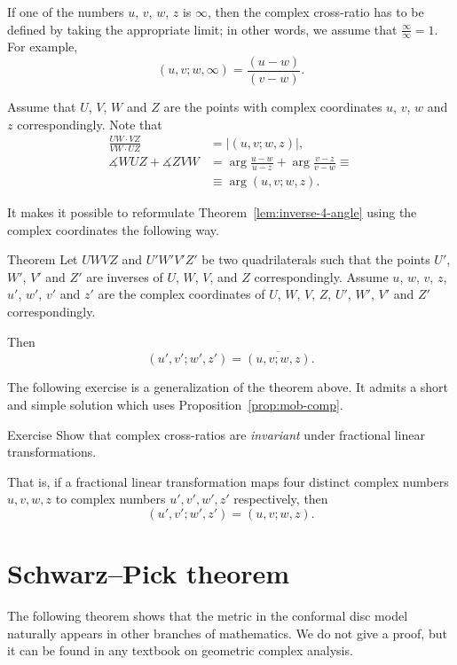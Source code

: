If one of the numbers $u$, $v$, $w$, $z$ is $\infty$, 
then the complex cross-ratio has to be defined by taking the appropriate limit; in other words, we assume that $\frac\infty\infty=1$.
For example,
$$(u, v; w, \infty)=\frac{(u-w)}{(v-w)}.$$

Assume that $U$, $V$, $W$ and  $Z$ are the points with complex coordinates  
$u$, $v$, $w$ and $z$ correspondingly.
Note that 
\begin{align*}
\frac{UW\cdot VZ}{VW\cdot UZ}&=|(u,v;w,z)|,
\\
\measuredangle WUZ +\measuredangle ZVW&=\arg\frac{u-w}{u-z}+\arg\frac{v-z}{v-w}\equiv 
\\
&\equiv \arg(u,v;w,z).
\end{align*}

It makes it possible to reformulate Theorem~\ref{lem:inverse-4-angle} using the complex coordinates
the following way.

\begin{thm}{Theorem}\label{lem:inverse-4-angle-C}
Let $UWVZ$ and $U'W'V'Z'$  be two quadrilaterals 
such that the points $U'$, $W'$, $V'$ and $Z'$ are inverses of $U$, $W$, $V$, and $Z$ correspondingly.
Assume $u$, $w$, $v$, $z$, $u'$, $w'$, $v'$ and $z'$ are the complex coordinates of $U$, $W$, $V$, $Z$, $U'$, $W'$, $V'$ and $Z'$ correspondingly.

Then 
$$(u',v';w',z')=\overline{(u,v;w,z)}.$$

\end{thm}

The following exercise is a generalization of the theorem above.
It admits a short and simple solution which uses Proposition~\ref{prop:mob-comp}.

\begin{thm}{Exercise}\label{ex:C-cross-ratio}
Show that 
complex cross-ratios are {}\emph{invariant} under fractional linear transformations. 

That is, if a fractional linear transformation maps four distinct complex numbers $u, v, w, z$ to complex numbers $u', v', w', z'$ respectively, then
$$
(u',v';w',z')
=
(u,v;w,z).
$$

\end{thm}

\section*{Schwarz--Pick theorem}
The following theorem shows 
that the metric in the conformal disc model naturally appears in other branches of mathematics.
We do not give a proof, but it can be found in any textbook on geometric complex analysis.

